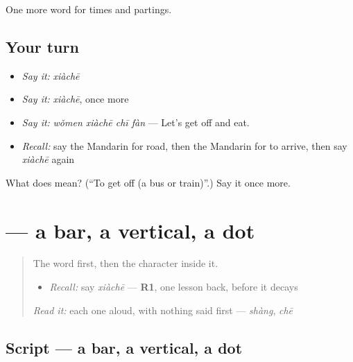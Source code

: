 \begin{grammarlens}[title={What you've built}]
One more word for times and partings.
\end{grammarlens}

\subsection*{Your turn}
\begin{itemize}
\raggedright
  \item \emph{Say it:} \emph{xiàchē}
  \item \emph{Say it:} \emph{xiàchē}, once more
  \item \emph{Say it:} \emph{wǒmen xiàchē chī fàn} — Let's get off and eat.
  \item \emph{Recall:} say the Mandarin for road, then the Mandarin for to arrive, then say \emph{xiàchē} again
\end{itemize}

\begin{tcolorbox}[breakable,colback=teal!4,colframe=teal!35!black,title={Before you move on}]
What does  mean? (\textquotedblleft{}To get off (a bus or train)\textquotedblright{}.) Say it once more.
\end{tcolorbox}
\section[\texorpdfstring{\zh{下} (xià)}{下 (xià)}]{ — a bar, a vertical, a dot}

\label{lesson:ZH-W73-xia}



\begin{quote}
The word first, then the character inside it.

\begin{itemize}
\raggedright
  \item \emph{Recall:} say \emph{xiàchē} — \textbf{R1}, one lesson back, before it decays
\end{itemize}

\begin{quote}
 
\end{quote}

\emph{Read it:} each one aloud, with nothing said first — \emph{shàng}, \emph{chē}
\end{quote}

\subsection*{Script — a bar, a vertical, a dot}

